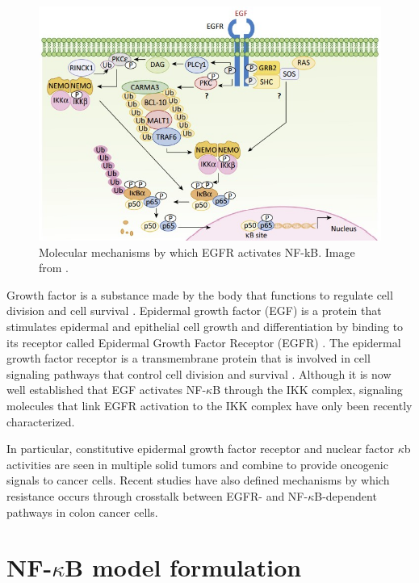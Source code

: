 \documentclass[12pt,a4paper]{report}
\begin{document}
\begin{figure}[!ht]
\includegraphics[scale=0.90]{EGFR.jpg}
\caption{Molecular mechanisms by which EGFR activates NF-kB. Image from \cite{EGFRNFkB}.}
\label{NFkBEGFR}
\end{figure}

Growth factor is a substance made by the body that functions to regulate cell division and cell survival \cite{GF}. Epidermal growth factor (EGF) is a protein that stimulates epidermal and epithelial cell growth and differentiation by binding to its receptor called Epidermal Growth Factor Receptor (EGFR) \cite{EGF}. The epidermal growth factor receptor is a transmembrane protein that is involved in cell signaling pathways that control cell division and survival \cite{EGFR}. Although it is now well established that EGF activates NF-$\kappa$B through the IKK complex, signaling molecules that link EGFR activation to the IKK complex have only been recently characterized.

In particular, constitutive epidermal growth factor receptor and nuclear factor $\kappa$b activities are seen in multiple solid tumors and combine to provide oncogenic signals to cancer cells. Recent studies have also defined mechanisms by which resistance occurs through crosstalk between EGFR- and NF-$\kappa$B-dependent pathways in colon cancer cells.






\chapter{NF-\texorpdfstring{$\kappa$}{}B model formulation}
\end{document}
